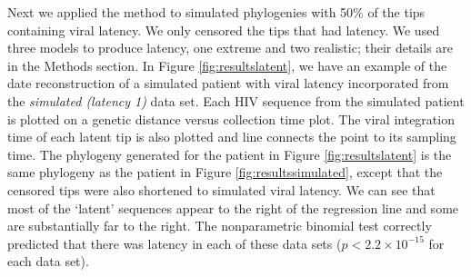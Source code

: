 \documentclass[12pt]{article}
\begin{document}





Next we applied the method to simulated phylogenies with 50\% of the tips containing viral latency.
We only censored the tips that had latency.
We used three models to produce latency, one extreme and two realistic; their details are in the Methods section.
In Figure \ref{fig:resultslatent}, we have an example of the date reconstruction of a simulated patient with viral latency incorporated from the \emph{simulated (latency 1)} data set.
Each HIV sequence from the simulated patient is plotted on a genetic distance versus collection time plot.
The viral integration time of each latent tip is also plotted and line connects the point to its sampling time.
The phylogeny generated for the patient in Figure \ref{fig:resultslatent} is the same phylogeny as the patient in Figure \ref{fig:resultssimulated}, except that the censored tips were also shortened to simulated viral latency.
We can see that most of the `latent' sequences appear to the right of the regression line and some are substantially far to the right.
The nonparametric binomial test correctly predicted that there was latency in each of these data sets ($p < 2.2 \times 10^{-15}$ for each data set).
\end{document}
